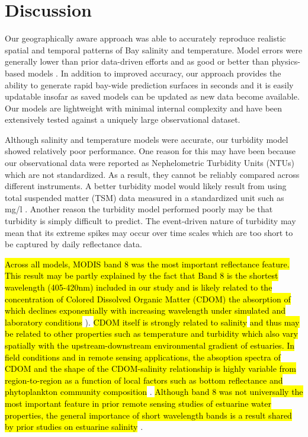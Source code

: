 \documentclass{article}
\begin{document}
\section{Discussion}

Our geographically aware approach was able to accurately reproduce realistic spatial and temporal patterns of Bay salinity and temperature. Model errors were generally lower than prior data-driven efforts and as good or better than physics-based models \cite{vogelAssessingSatelliteSea2016}. In addition to improved accuracy, our approach provides the ability to generate rapid bay-wide prediction surfaces in seconds and it is easily updatable insofar as saved models can be updated as new data become available. Our models are lightweight with minimal internal complexity and have been extensively tested against a uniquely large observational dataset.

Although salinity and temperature models were accurate, our turbidity model showed relatively poor performance. One reason for this may have been because our observational data were reported as Nephelometric Turbidity Units (NTUs) which are not standardized. As a result, they cannot be reliably compared across different instruments. A better turbidity model would likely result from using total suspended matter (TSM) data measured in a standardized unit such as mg/l \cite{ondrusekDevelopmentNewOptical2012}. Another reason the turbidity model performed poorly may be that turbidity is simply difficult to predict. The event-driven nature of turbidity may mean that its extreme spikes may occur over time scales which are too short to be captured by daily reflectance data.

\hl{Across all models, MODIS band 8 was the most important reflectance feature. This result may be partly explained by the fact that Band 8 is the shortest wavelength (405-420nm) included in our study and is likely related to the concentration of Colored Dissolved Organic Matter (CDOM) the absorption of which declines exponentially with increasing wavelength under simulated and laboratory conditions} \cite{loiselleOpticalCharacterizationChromophoric2009, sathyendranath2000remote}). \hl{CDOM itself is strongly related to salinity} \cite{sathyendranath2000remote, vogelAssessingSatelliteSea2016, wangDevelopmentMODISData2018} \hl{and thus may be related to other properties such as temperature and turbidity which also vary spatially with the upstream-downstream environmental gradient of estuaries. In field conditions and in remote sensing applications, the absoption spectra of CDOM and the shape of the CDOM-salinity relationship is highly variable from region-to-region as a function of local factors such as bottom reflectance and phytoplankton community composition} \cite{sathyendranath2000remote}. \hl{Although band 8 was not universally the most important feature in prior remote sensing studies of estuarine water properties, the general importance of short wavelength bands is a result shared by prior studies on estuarine salinity} \cite{wangDevelopmentMODISData2018}.
\end{document}

